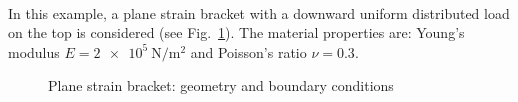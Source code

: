 \paragraph{}
In this example, a plane strain bracket with a downward uniform distributed load on the top is considered (see Fig.~\ref{adp_fig:ex_bracket_geo_bc}).
The material properties are: Young’s modulus $E = \SI{2e5}{\newton \per \square \meter}$ and Poisson’s ratio $\nu = 0.3$.
    \begin{figure}
        \centering
        \begin{subfigure}[b]{1\linewidth}
            \centering
        \end{subfigure}
    \end{figure}
    \begin{figure}\ContinuedFloat
        \begin{subfigure}[b]{1\linewidth}
            \centering
        \end{subfigure}
        \caption{ Plane strain bracket: geometry and boundary conditions}
        \label{adp_fig:ex_bracket_geo_bc}
    \end{figure}

